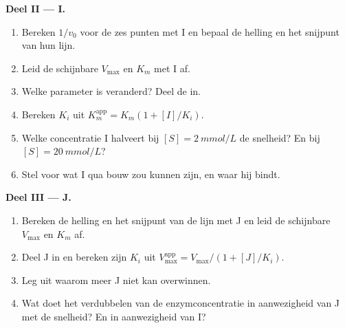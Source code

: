 \begin{problem}
\medskip
\noindent\textbf{Deel II ---  I.}
\begin{enumerate}[resume]
  \item Bereken $1/v_0$ voor de zes punten met I en bepaal de helling en
        het snijpunt van hun lijn.
  \item Leid de schijnbare $V_{\max}$ en $K_m$ met I af.
  \item Welke parameter is veranderd? Deel de  in.
  \item Bereken $K_i$ uit $K_m^{\text{app}} = K_m(1 + [I]/K_i)$.
  \item Welke concentratie I halveert bij $[S] = \qty{2}{mmol/L}$ de
        snelheid? En bij $[S] = \qty{20}{mmol/L}$?
  \item Stel voor wat I qua bouw zou kunnen zijn, en waar hij bindt.
\end{enumerate}

\medskip
\noindent\textbf{Deel III ---  J.}
\begin{enumerate}[resume]
  \item Bereken de helling en het snijpunt van de lijn met J en leid de
        schijnbare $V_{\max}$ en $K_m$ af.
  \item Deel J in en bereken zijn $K_i$ uit $V_{\max}^{\text{app}} =
        V_{\max}/(1 + [J]/K_i)$.
  \item Leg uit waarom meer  J niet kan overwinnen.
  \item Wat doet het verdubbelen van de enzymconcentratie in aanwezigheid
        van J met de snelheid? En in aanwezigheid van I?
\end{enumerate}


\end{problem}
